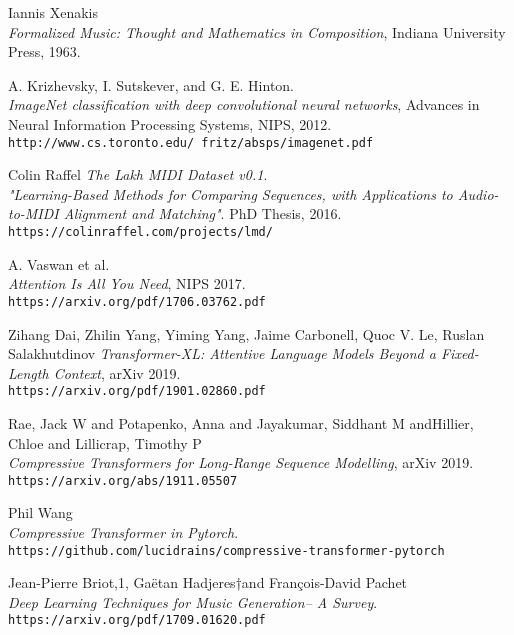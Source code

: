 
\begin{thebibliography}{9}
	
	Iannis Xenakis
	\\\textit{Formalized Music: Thought and Mathematics in Composition}, Indiana University Press, 1963. 
	
	A. Krizhevsky, I. Sutskever, and G. E. Hinton.
	\\\textit{ImageNet classification with deep convolutional neural networks}, Advances in Neural Information Processing Systems, NIPS, 2012. 
	\\\texttt{http://www.cs.toronto.edu/~fritz/absps/imagenet.pdf}
	
	Colin Raffel
	\textit{The Lakh MIDI Dataset v0.1}. \\
	\textit{ "Learning-Based Methods for Comparing Sequences, with Applications to Audio-to-MIDI Alignment and Matching"}. PhD Thesis, 2016.
	\\\texttt{https://colinraffel.com/projects/lmd/}
	
	A. Vaswan et al.
	\\\textit{Attention Is All You Need}, NIPS 2017. 
	\\\texttt{https://arxiv.org/pdf/1706.03762.pdf}

	Zihang Dai, Zhilin Yang, Yiming Yang, Jaime Carbonell, Quoc V. Le, Ruslan Salakhutdinov
	\textit{Transformer-XL: Attentive Language Models Beyond a Fixed-Length Context}, arXiv 2019. 
	\\\texttt{https://arxiv.org/pdf/1901.02860.pdf}

	Rae, Jack W and Potapenko, Anna and Jayakumar, Siddhant M andHillier, Chloe and Lillicrap, Timothy P \\
	\textit{Compressive Transformers for Long-Range Sequence Modelling}, arXiv 2019. 
	\\\texttt{https://arxiv.org/abs/1911.05507}
	 
	Phil Wang
	\\\textit{Compressive Transformer in Pytorch}.
	\\\texttt{https://github.com/lucidrains/compressive-transformer-pytorch}
	
	Jean-Pierre Briot,1, Ga\"etan Hadjeres†and Fran\c{c}ois-David Pachet
	\\\textit{Deep Learning Techniques for Music Generation– A Survey}.
	\\\texttt{https://arxiv.org/pdf/1709.01620.pdf}


\end{thebibliography}

